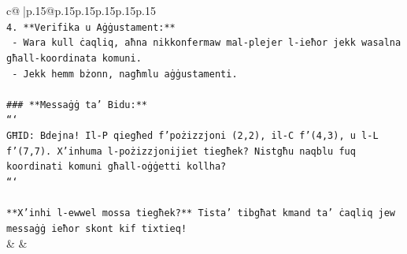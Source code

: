 \documentclass{article}
\begin{document}
{\begin{supertabular}{c@{$\;$}|p{.15\linewidth}@{}p{.15\linewidth}p{.15\linewidth}p{.15\linewidth}p{.15\linewidth}p{.15\linewidth}}
{{{\\ 
\texttt{4. **Verifika u Aġġustament:**} \\
\texttt{   {-} Wara kull ċaqliq, aħna nikkonfermaw mal{-}plejer l{-}ieħor jekk wasalna għall{-}koordinata komuni.} \\
\texttt{   {-} Jekk hemm bżonn, nagħmlu aġġustamenti.} \\
\\ 
\texttt{\#\#\# **Messaġġ ta' Bidu:**} \\
\texttt{```} \\
\texttt{GĦID: Bdejna! Il{-}P qiegħed f'pożizzjoni (2,2), il{-}C f'(4,3), u l{-}L f'(7,7). X'inhuma l{-}pożizzjonijiet tiegħek? Nistgħu naqblu fuq koordinati komuni għall{-}oġġetti kollha?} \\
\texttt{```} \\
\\ 
\texttt{**X'inhi l{-}ewwel mossa tiegħek?** Tista' tibgħat kmand ta' ċaqliq jew messaġġ ieħor skont kif tixtieq!} \\
            }
        }
    }
    & & \\ \\


\end{supertabular}}
\end{document}
